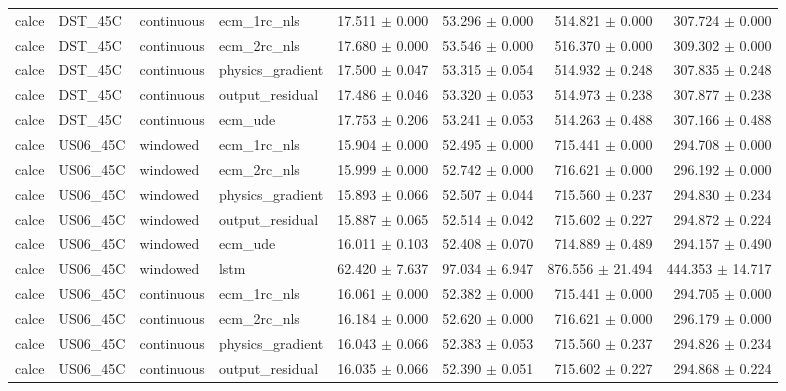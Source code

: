 \begin{longtable}{llllrrrr}
calce & DST\_45C & continuous & ecm\_1rc\_nls & 17.511 $\pm$ 0.000 & 53.296 $\pm$ 0.000 & 514.821 $\pm$ 0.000 & 307.724 $\pm$ 0.000 \\
calce & DST\_45C & continuous & ecm\_2rc\_nls & 17.680 $\pm$ 0.000 & 53.546 $\pm$ 0.000 & 516.370 $\pm$ 0.000 & 309.302 $\pm$ 0.000 \\
calce & DST\_45C & continuous & physics\_gradient & 17.500 $\pm$ 0.047 & 53.315 $\pm$ 0.054 & 514.932 $\pm$ 0.248 & 307.835 $\pm$ 0.248 \\
calce & DST\_45C & continuous & output\_residual & 17.486 $\pm$ 0.046 & 53.320 $\pm$ 0.053 & 514.973 $\pm$ 0.238 & 307.877 $\pm$ 0.238 \\
calce & DST\_45C & continuous & ecm\_ude & 17.753 $\pm$ 0.206 & 53.241 $\pm$ 0.053 & 514.263 $\pm$ 0.488 & 307.166 $\pm$ 0.488 \\
calce & US06\_45C & windowed & ecm\_1rc\_nls & 15.904 $\pm$ 0.000 & 52.495 $\pm$ 0.000 & 715.441 $\pm$ 0.000 & 294.708 $\pm$ 0.000 \\
calce & US06\_45C & windowed & ecm\_2rc\_nls & 15.999 $\pm$ 0.000 & 52.742 $\pm$ 0.000 & 716.621 $\pm$ 0.000 & 296.192 $\pm$ 0.000 \\
calce & US06\_45C & windowed & physics\_gradient & 15.893 $\pm$ 0.066 & 52.507 $\pm$ 0.044 & 715.560 $\pm$ 0.237 & 294.830 $\pm$ 0.234 \\
calce & US06\_45C & windowed & output\_residual & 15.887 $\pm$ 0.065 & 52.514 $\pm$ 0.042 & 715.602 $\pm$ 0.227 & 294.872 $\pm$ 0.224 \\
calce & US06\_45C & windowed & ecm\_ude & 16.011 $\pm$ 0.103 & 52.408 $\pm$ 0.070 & 714.889 $\pm$ 0.489 & 294.157 $\pm$ 0.490 \\
calce & US06\_45C & windowed & lstm & 62.420 $\pm$ 7.637 & 97.034 $\pm$ 6.947 & 876.556 $\pm$ 21.494 & 444.353 $\pm$ 14.717 \\
calce & US06\_45C & continuous & ecm\_1rc\_nls & 16.061 $\pm$ 0.000 & 52.382 $\pm$ 0.000 & 715.441 $\pm$ 0.000 & 294.705 $\pm$ 0.000 \\
calce & US06\_45C & continuous & ecm\_2rc\_nls & 16.184 $\pm$ 0.000 & 52.620 $\pm$ 0.000 & 716.621 $\pm$ 0.000 & 296.179 $\pm$ 0.000 \\
calce & US06\_45C & continuous & physics\_gradient & 16.043 $\pm$ 0.066 & 52.383 $\pm$ 0.053 & 715.560 $\pm$ 0.237 & 294.826 $\pm$ 0.234 \\
calce & US06\_45C & continuous & output\_residual & 16.035 $\pm$ 0.066 & 52.390 $\pm$ 0.051 & 715.602 $\pm$ 0.227 & 294.868 $\pm$ 0.224 \\

\end{longtable}
